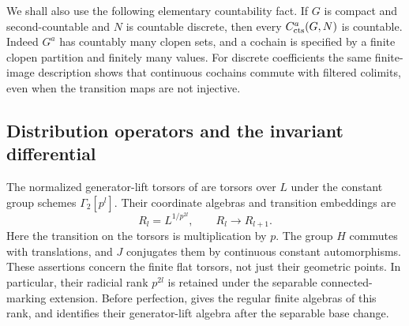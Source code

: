 We shall also use the following elementary countability fact.  If $G$ is
compact and second-countable and $N$ is countable discrete, then every
$C^a_{\mathrm{cts}}(G,N)$ is countable.  Indeed $G^a$ has countably many clopen
sets, and a cochain is specified by a finite clopen partition and
finitely many values.  For discrete coefficients the same finite-image
description shows that continuous cochains commute with filtered
colimits, even when the transition maps are not injective.

\subsection{Distribution operators and the invariant differential}

The normalized generator-lift torsors of
 are torsors over $L$
under the constant group schemes $\Gamma_2[p^l]$.  Their coordinate
algebras and transition embeddings are
\begin{equation}\label{h3:co:root-torsors}
 R_l=L^{1/p^{2l}},\qquad R_l\longrightarrow R_{l+1}.
\end{equation}
Here the transition on the torsors is multiplication by $p$.
The group $H$ commutes with translations, and $J$ conjugates them by
continuous constant automorphisms.  These assertions concern the finite
flat torsors, not just their geometric points.  In particular, their
radicial rank $p^{2l}$ is retained under the separable connected-marking
extension.  Before perfection,  gives the
regular finite algebras of this rank, and 
identifies their generator-lift algebra after the separable base change.

